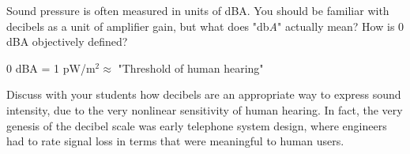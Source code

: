 

Sound pressure is often measured in units of dBA.  You should be familiar with decibels as a unit of amplifier gain, but what does "db{\it A}" actually mean?  How is 0 dBA objectively defined?







0 dBA = 1 pW/m$^{2} $$\approx$ "Threshold of human hearing"







Discuss with your students how decibels are an appropriate way to express sound intensity, due to the very nonlinear sensitivity of human hearing.  In fact, the very genesis of the decibel scale was early telephone system design, where engineers had to rate signal loss in terms that were meaningful to human users.




